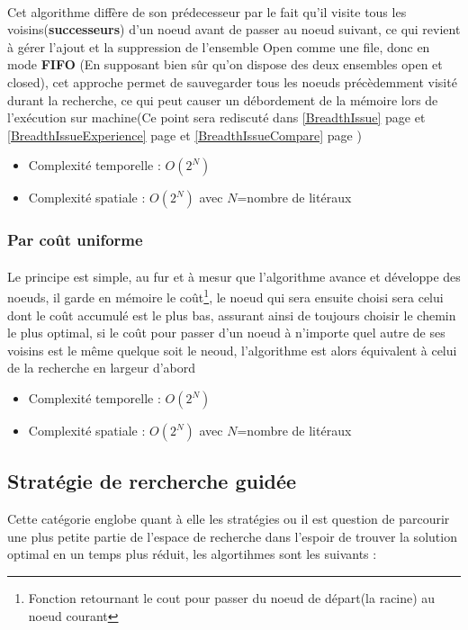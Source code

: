 \paragraph{}
Cet algorithme diffère de son prédecesseur par le fait qu'il visite tous les voisins(\textbf{successeurs}) d'un noeud avant de passer au noeud suivant, ce qui revient à gérer l'ajout et la suppression de l'ensemble Open comme une file, donc en mode \textbf{FIFO} (En supposant bien sûr qu'on dispose des deux ensembles open et closed), cet approche permet de sauvegarder tous les noeuds précèdemment visité durant la recherche, ce qui peut causer un débordement de la mémoire lors de l'exécution sur machine(Ce point sera rediscuté dans \ref{BreadthIssue} page \pageref{BreadthIssue} et \ref{BreadthIssueExperience} page \pageref{BreadthIssueExperience} et \ref{BreadthIssueCompare} page \pageref{BreadthIssueCompare})

\begin{itemize}
	\item Complexité temporelle : $O(2^{N})$
	\item Complexité spatiale : $O(2^N)$ avec $N$=nombre de litéraux 
\end{itemize}
\subsubsection{Par coût uniforme}\label{DijkstraDef}
\paragraph{}
Le principe est simple, au fur et à mesur que l'algorithme avance et développe des noeuds, il garde en mémoire le coût\footnote[1]{Fonction retournant le cout pour passer du noeud de départ(la racine) au noeud courant}, le noeud qui sera ensuite choisi sera celui dont le coût accumulé est le plus bas, assurant ainsi de toujours choisir le chemin le plus optimal, si le coût pour passer d'un noeud à n'importe quel autre de ses voisins est le même quelque soit le neoud, l'algorithme est alors équivalent à celui de la recherche en largeur d'abord
\begin{itemize}
	\item Complexité temporelle : $O(2^{N})$
	\item Complexité spatiale : $O(2^N)$ avec $N$=nombre de litéraux  
\end{itemize}
\subsection{Stratégie de rercherche guidée}
Cette catégorie englobe quant à elle les stratégies ou il est question de parcourir une plus petite partie de l'espace de recherche dans l'espoir de trouver la solution optimal en un temps plus réduit, les algortihmes sont les suivants : 

